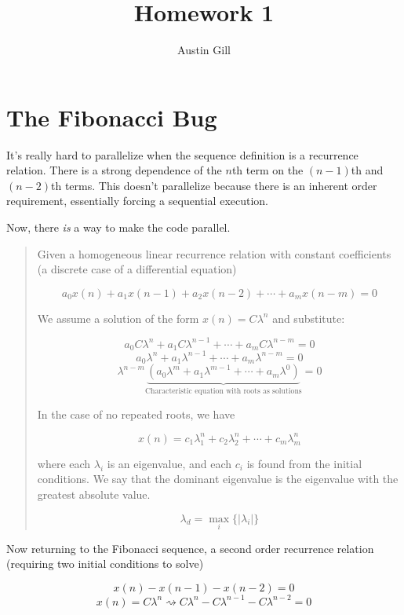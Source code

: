 \documentclass{article}
\title{Homework 1}
\author{Austin Gill}
\begin{document}
\maketitle

\section*{The Fibonacci Bug}
    It's really hard to parallelize when the sequence definition is a recurrence relation. There is a strong dependence of the $n$th term on the $(n-1)$th and $(n-2)$th terms. This doesn't parallelize because there is an inherent order requirement, essentially forcing a sequential execution.

    Now, there \textit{is} a way to make the code parallel.

   \begin{quote}
       Given a homogeneous linear recurrence relation with constant coefficients (a discrete case of a differential equation)

       \[ a_0 x(n) + a_1 x(n - 1) + a_2 x(n - 2) + \cdots + a_m x(n - m) = 0 \]

       We assume a solution of the form $x(n) = C\lambda^n$ and substitute:

       \[ a_0 C\lambda^n + a_1 C \lambda^{n - 1} + \cdots + a_m C \lambda^{n - m} = 0 \]
       \[ a_0 \lambda^n + a_1 \lambda^{n - 1} + \cdots + a_m \lambda^{n - m} = 0 \]
       \[ \lambda^{n - m} \underbrace{( a_0 \lambda^m + a_1 \lambda^{m - 1} + \cdots + a_m \lambda^0 )}_{\text{Characteristic equation with roots as solutions}} = 0 \]

       In the case of no repeated roots, we have

       \[ x(n) = c_1 \lambda_1^n + c_2 \lambda_2^n + \cdots + c_m \lambda_m^n \]

       where each $\lambda_i$ is an eigenvalue, and each $c_i$ is found from the initial conditions. We say that the dominant eigenvalue is the eigenvalue with the greatest absolute value.

       \[ \lambda_d = \max_i\{ \vert \lambda_i \vert \} \]
   \end{quote}

   Now returning to the Fibonacci sequence, a second order recurrence relation (requiring two initial conditions to solve)

   \[ x(n) - x(n - 1) - x(n - 2) = 0 \]
   \[ x(n) = C\lambda^n \rightsquigarrow C\lambda^n - C \lambda^{n - 1} - C\lambda^{n - 2} = 0 \]
\end{document}
